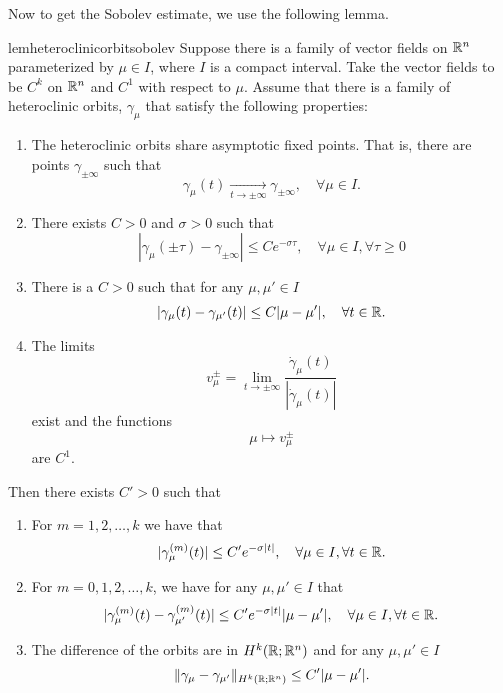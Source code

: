 Now to get the Sobolev estimate, we use the following lemma.
\begin{restatable}{lem}{heteroclinicorbitsobolev}\label{heteroclinic-orbit-sobolev}
	Suppose there is a family of vector fields on \(\mathbb{R}^n\) parameterized by \(\mu\in I\), where \(I\) is a compact interval.  Take the vector fields to be \(C^k\) on \(\mathbb{R}^n\) and \(C^1\) with respect to \(\mu\). Assume that there is a family of heteroclinic orbits, \(\gamma_\mu\) that satisfy the following properties:
	\begin{enumerate}[label=(\roman*)]
		\item The heteroclinic orbits share asymptotic fixed points. That is, there are points \(\gamma_{\pm \infty}\) such that 
		\begin{equation}
			\gamma_\mu(t) \xrightarrow[t\to\pm\infty]{} \gamma_{\pm\infty}, \quad \forall\mu\in I.
		\end{equation}
		\item There exists \(C > 0\) and \(\sigma > 0\) such that 
		\begin{equation}
			|\gamma_\mu(\pm \tau) - \gamma_{\pm\infty}| \leq C e^{-\sigma \tau}, \quad \forall \mu\in I, \forall \tau\geq 0
		\end{equation}
		\item There is a \(C> 0\) such that for any \(\mu, \mu'\in I\)
		\begin{equation}
			|\gamma_\mu(t) -\gamma_{\mu'}(t) | \leq C |\mu - \mu'|, \quad \forall t \in \mathbb{R}.
		\end{equation}
		\item The limits \[v_\mu^{\pm} = \lim_{t\to\pm\infty} \frac{\dot \gamma_\mu(t)}{|\dot \gamma_\mu(t)|}\] exist and the functions
		\begin{equation}
			\mu \mapsto v^\pm_\mu
		\end{equation}
		are \(C^1\).
	\end{enumerate}
	Then there exists \(C'>0\) such that 
	\begin{enumerate}[label=(\alph*)]
		\item For \(m = 1, 2, \ldots, k\) we have that 
		\begin{equation}\label{expoential-decay-derivatives}
			|\gamma_\mu^{(m)}(t)|  \leq C' e^{-\sigma|t|}, \quad \forall\mu\in I, \forall t\in \mathbb{R}.
		\end{equation}
		\item For \(m = 0,1,2,\ldots, k\), we have for any \(\mu,\mu'\in I\) that
		\begin{equation}
			|\gamma_\mu^{(m)}(t) - \gamma_{\mu'}^{(m)}(t) |  \leq C' e^{-\sigma|t|} |\mu - \mu'|, \quad \forall\mu\in I, \forall t\in \mathbb{R}.
		\end{equation}
		\item The difference of the orbits are in \(H^k(\mathbb{R};\mathbb{R}^n)\) and for any \(\mu,\mu'\in I\)
		\begin{equation}
			\| \gamma_\mu - \gamma_{\mu'} \|_{H^k(\mathbb{R};\mathbb{R}^n)} \leq C' |\mu -\mu'|.
		\end{equation}
	\end{enumerate}
\end{restatable}
